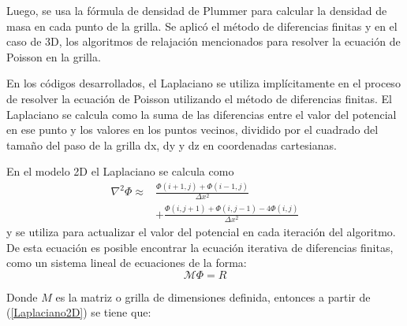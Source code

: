 \documentclass[reprint,amsmath,amssymb,aps]{revtex4-1}
\begin{document}
Luego, se usa la fórmula de densidad de Plummer para calcular la densidad de masa en cada punto de la grilla. Se aplicó el método de diferencias finitas y en el caso de 3D, los algoritmos de relajación mencionados para resolver la ecuación de Poisson en la grilla.

En los códigos desarrollados, el Laplaciano se utiliza implícitamente en el proceso de resolver la ecuación de Poisson utilizando el método de diferencias finitas. El Laplaciano se calcula como la suma de las diferencias entre el valor del potencial en ese punto y los valores en los puntos vecinos, dividido por el cuadrado del tamaño del paso de la grilla dx, dy y dz en coordenadas cartesianas\cite{laplacian}.

En el modelo 2D el Laplaciano se calcula como
\begin{equation}\label{Laplaciano2D}
\begin{split}
\nabla^2 \Phi \approx & \frac{\Phi(i+1, j) + \Phi(i-1, j)}{\Delta x^2} \\
& + \frac{\Phi(i, j+1) + \Phi(i, j-1) - 4\Phi(i, j)}{\Delta x^2}
\end{split}
\end{equation}
y se utiliza para actualizar el valor del potencial en cada iteración del algoritmo.
De esta ecuación es posible encontrar la ecuación iterativa de diferencias finitas, como un sistema lineal de ecuaciones de la forma:
\begin{equation}
    \mathcal{M} \Phi = R
    \label{kan:1}
\end{equation}

Donde $M$ es la matriz o grilla de dimensiones definida, entonces a partir de (\ref{Laplaciano2D}) se tiene que:
\end{document}
